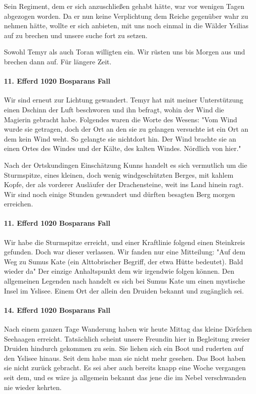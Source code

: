 Sein Regiment, dem er sich anzuschließen gehabt hätte, war vor wenigen Tagen abgezogen worden. Da er nun keine Verplichtung dem Reiche gegenüber wahr zu nehmen hätte, wollte er sich anbieten, mit uns noch einmal in die Wälder Ysilias auf zu brechen und unsere suche fort zu setzen.

Sowohl Temyr als auch Toran willigten ein. Wir rüsten uns bis Morgen aus und brechen dann auf. Für längere Zeit.

\paragraph{11. Efferd 1020 Bosparans Fall}
Wir sind erneut zur Lichtung gewandert. Temyr hat mit meiner Unterstützung einen Dschinn der Luft beschworen und ihn befragt, wohin der Wind die Magierin gebracht habe. Folgendes waren die Worte des Wesens: "Vom Wind wurde sie getragen, doch der Ort an den sie zu gelangen versuchte ist ein Ort an dem kein Wind weht. So gelangte sie nichtdort hin. Der Wind brachte sie an einen Ortes des Windes und der Kälte, des kalten Windes. Nördlich von hier."

Nach der Ortskundingen Einschätzung Kunns handelt es sich vermutlich um die Sturmspitze, eines kleinen, doch wenig windgeschützten Berges, mit kahlem Kopfe, der als vorderer Ausläufer der Drachensteine, weit ins Land hinein ragt.
Wir sind noch einige Stunden gewandert und dürften besagten Berg morgen erreichen.

\paragraph{11. Efferd 1020 Bosparans Fall}
Wir habe die Sturmspitze erreicht, und einer Kraftlinie folgend einen Steinkreis gefunden. Doch war dieser verlassen. Wir fanden nur eine Mitteilung: "Auf dem Weg zu Sumus Kate (ein Alttobrischer Begriff, der etwa Hütte bedeutet). Bald wieder da"
Der einzige Anhaltspunkt dem wir irgendwie folgen können.
Den allgemeinen Legenden nach handelt es sich bei Sumus Kate um einen mystische Insel im Yslisee. Einem Ort der allein den Druiden bekannt und zugänglich sei.

\paragraph{14. Efferd 1020 Bosparans Fall}
Nach einem ganzen Tage Wanderung haben wir heute Mittag das kleine Dörfchen Seehaagen erreicht. Tatsächlich scheint unsere Freundin hier in Begleitung zweier Druiden hindurch gekommen zu sein. Sie liehen sich ein Boot und ruderten auf den Yslisee hinaus. Seit dem habe man sie nicht mehr gesehen. Das Boot haben sie nicht zurück gebracht. Es sei aber auch bereits knapp eine Woche vergangen seit dem, und es wäre ja allgemein bekannt das jene die im Nebel verschwanden nie wieder kehrten.


